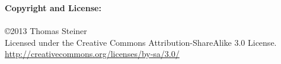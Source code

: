 \begin{acknowledgements}
\normalsize

\vspace{10mm}
\textbf{Copyright and License:}\\\\
\small \copyright \normalsize 2013 Thomas Steiner\\
Licensed under the Creative Commons Attribution-ShareAlike 3.0 License.\\
\url{http://creativecommons.org/licenses/by-sa/3.0/}

\end{acknowledgements}
